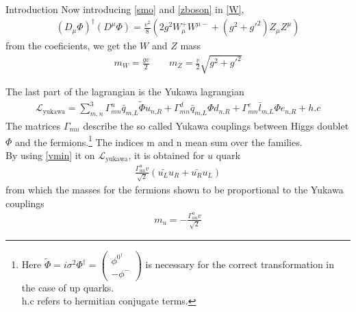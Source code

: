 \begin{chapter}{Introduction}
Now introducing \ref{smo} and \ref{zboson} in \ref{W},
\begin{align}
(D_\mu \Phi)^\dagger (D^\mu \Phi)=\frac{v^2}{8}\left(2g^2 W_\mu^+ W^{\mu-} + (g^2+g'^2)Z_\mu Z^\mu  \right)  
\end{align}
from the coeficients, we get the $W$ and $Z$ mass  
\begin{align}
m_W=\frac{gv}{2} \qquad  m_Z=\frac{v}{2}\sqrt{g^2+g'^2}
\end{align}


The last part of the lagrangian is the Yukawa lagrangian
\begin{align}
\mathcal{L}_\text{yukawa}=\sum_{m,n}^{3}  \Gamma^u_{mn}\bar{q}_{m\text{,}L} \tilde{\Phi} u_{n\text{,}R}+\Gamma^d_{mn}\bar{q}_{m\text{,}L} \Phi d_{n\text{,}R}+\Gamma^e_{mn}\bar{l}_{m\text{,}L} \Phi e_{n\text{,}R}+h.c
\end{align}
The matrices $\Gamma_{mn}$ describe the so called Yukawa couplings between Higgs doublet $\Phi$ and the fermions.\footnote{Here $
	\tilde{\Phi}=i\sigma^2 \Phi^\dagger =\left(\begin{array}{c}
	\phi^{0^\dagger} \\
	-\phi^-
	\end{array} \right)
	$ is necessary for the correct transformation in the case of up quarks. \\
h.c refers to hermitian conjugate terms.  }  The indices  m and n mean sum over the families. \\
  

By using \ref{vmin} it on $\mathcal{L}_\text{yukawa}$,  it is obtained for $u$ quark
\begin{align*}
\frac{\Gamma^u_{uu}v}{\sqrt{2}}(\bar{u_L}u_R+\bar{u_R}u_L)
\end{align*}
from which the masses for the fermions shown to be proportional to the Yukawa couplings
\begin{align*}
m_u=-\frac{\Gamma^u_{uu}v}{\sqrt{2}}
\end{align*}
 

\end{chapter}
